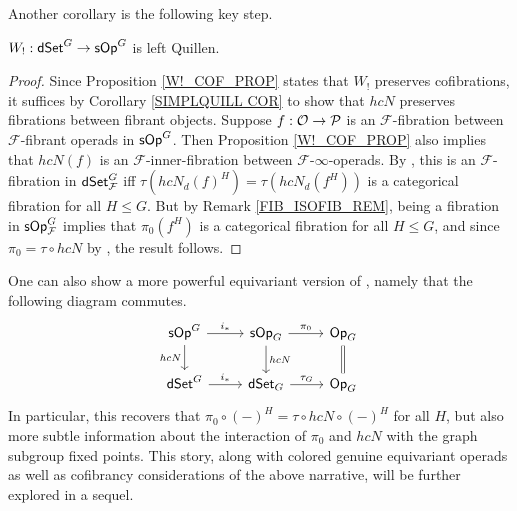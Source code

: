 \documentclass[a4paper,10pt
,draft
]{article}%
\renewcommand{\F}{\mathcal F}
\renewcommand{\1}{\eta}%
\begin{document}
Another corollary is the following key step.

\begin{proposition}[{cf. \cite[Prop. 4.9]{CM11}}]
      $W_!: \mathsf{dSet}^G \to \mathsf{sOp}^G$ is left Quillen.
\end{proposition}
\begin{proof}
      Since Proposition \ref{W!_COF_PROP} states that $W_!$ preserves cofibrations,
      it suffices by Corollary \ref{SIMPLQUILL COR} to show that $h c N$ preserves fibrations between fibrant objects.
      Suppose $f: \mathcal{O} \to \mathcal{P}$ is an $\F$-fibration between $\F$-fibrant operads in $\mathsf{sOp}^G$.
      Then Proposition \ref{W!_COF_PROP} also implies that $h c N (f)$ is an $\F$-inner-fibration between $\F$-$\infty$-operads.
      By \cite[Thm. 8.22]{Per18}, this is an $\F$-fibration in $\dSet^G_\F$ iff $\tau (h c N_d(f)^H) = \tau (h c N_d(f^H))$ is a categorical fibration for all $H \leq G$.
      But by Remark \ref{FIB_ISOFIB_REM}, being a fibration in $\sOp^G_\F$ implies that $\pi_0(f^H)$ is a categorical fibration for all $H \leq G$, 
      and since $\pi_0 = \tau \circ h c N$ by \cite[Prop. 4.8]{CM11}, the result follows.
\end{proof}

\begin{remark}
      One can also show a more powerful equivariant version of \cite[Prop. 4.8]{CM11},
      namely that the following diagram commutes.
      \begin{equation}
            \begin{tikzcd}
                  \sOp^G \arrow[r, "i_{\**}"] \arrow[d, "h c N"']
                  &
                  \sOp_G \arrow[d, "h c N"] \arrow[r, "\pi_0"]
                  &
                  \Op_G \arrow[d, equal]
                  \\
                  \dSet^G \arrow[r, "i_{\**}"]
                  &
                  \dSet_G \arrow[r, "\tau_G"]
                  &
                  \Op_G
            \end{tikzcd}
      \end{equation}
      In particular, this recovers that $\pi_0 \circ (-)^H = \tau \circ h c N \circ (-)^H$ for all $H$,
      but also more subtle information about the interaction of $\pi_0$ and $h c N$ with the graph subgroup fixed points.
      This story, along with colored genuine equivariant operads as well as cofibrancy considerations of the above narrative,
      will be further explored in a sequel. 
\end{remark}
\end{document}
